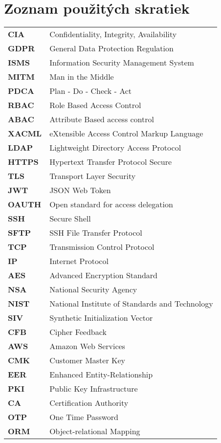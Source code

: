 \thispagestyle{plain}

\section*{\Huge Zoznam použitých skratiek}
\vskip 1cm

\begin{tabular}{ >{\bfseries}m{2cm} m{10cm} }
CIA		& Confidentiality, Integrity, Availability \\
GDPR    & General Data Protection Regulation \\
ISMS    & Information Security Management System \\
MITM    & Man in the Middle\\
PDCA    & Plan - Do - Check - Act\\
RBAC    & Role Based Access Control\\
ABAC    & Attribute Based access control\\
XACML   & eXtensible Access Control Markup Language\\
LDAP    & Lightweight Directory Access Protocol\\
HTTPS   & Hypertext Transfer Protocol Secure\\
TLS     & Transport Layer Security\\
JWT     & JSON Web Token\\
OAUTH   & Open standard for access delegation\\
SSH     & Secure Shell\\
SFTP    & SSH File Transfer Protocol\\
TCP     & Transmission Control Protocol\\
IP      & Internet Protocol\\
AES     & Advanced Encryption Standard\\
NSA     & National Security Agency\\
NIST    & National Institute of Standards and Technology\\
SIV     & Synthetic Initialization Vector\\
CFB     & Cipher Feedback\\
AWS     & Amazon Web Services\\
CMK     & Customer Master Key\\
EER     & Enhanced Entity-Relationship\\
PKI     & Public Key Infrastructure\\
CA      & Certification Authority\\
OTP     & One Time Password\\
ORM     & Object-relational Mapping\\
\end{tabular}

\emptypage
